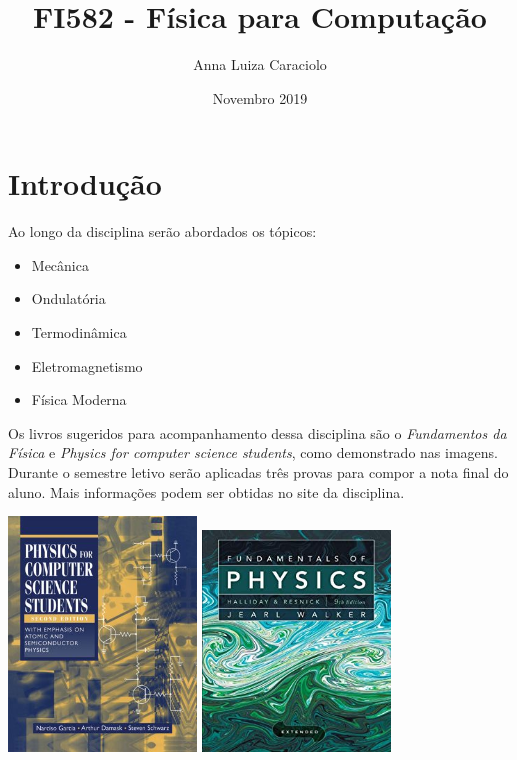 \documentclass[a4 paper, 10pt]{article}
\title{FI582 - Física para Computação}
\author{Anna Luiza Caraciolo}
\date{Novembro 2019}
\begin{document}
\maketitle

\section{Introdução}
Ao longo da disciplina serão abordados os tópicos: 
\begin{itemize}
    \item Mecânica
    \item Ondulatória
    \item Termodinâmica
    \item Eletromagnetismo
    \item Física Moderna
\end{itemize}
 Os livros sugeridos para acompanhamento dessa disciplina são o \textit{Fundamentos da Física}\cite{Livro2} e \textit{Physics for computer science students}\cite{Livro1}, como demonstrado nas imagens. Durante o semestre letivo serão aplicadas três provas para compor a nota final do aluno. Mais informações podem ser obtidas no site da disciplina.\cite{FI582}
 \vspace{5mm}

\includegraphics[width=5cm]{Livro1.jpg}
\includegraphics[width=5cm]{Livro2.jpg}
\end{document}
